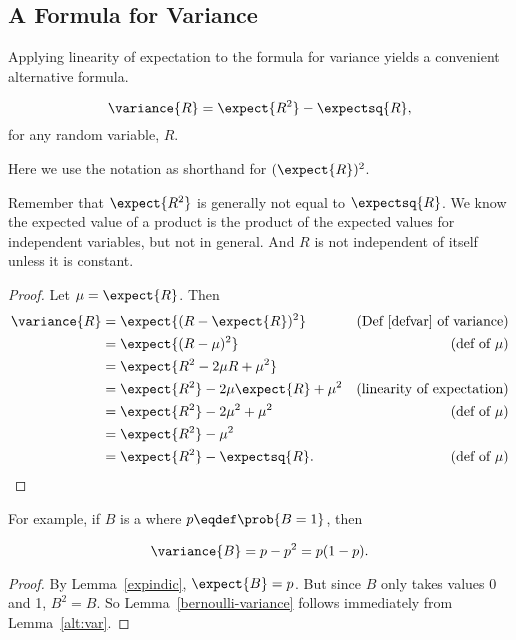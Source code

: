\iffalse
For example, for independent random variables, the variance of a sum
is the sum of the variances; that is, $\variance{R_1 + R_2} =
\variance{R_1} + \variance{R_2}$.  We will prove this fact below.
\fi

\subsection{A Formula for Variance}

Applying linearity of expectation to the formula for variance yields a convenient
alternative formula.
\begin{lemma}\label{alt:var}
\[
\variance{R} = \expect{R^2} - \expectsq{R},
\]
for any random variable, $R$.
\end{lemma}
Here we use the notation  as shorthand for
$(\expect{R})^2$.

\begin{editingnotes}
Remember that $\expect{R^2}$ is generally not equal to $\expectsq{R}$.  We
know the expected value of a product is the product of the expected values
for independent variables, but not in general.  And $R$ is not independent
of itself unless it is constant.

\end{editingnotes}

\begin{proof}
Let $\mu = \expect{R}$.  Then
\begin{align*}
\variance{R} & =   \expect{(R - \expect{R})^2}
               & \text{(Def~\ref{defvar} of variance)}\\
        & = \expect{(R - \mu)^2} & \text{(def of $\mu$)}\\
        & = \expect{R^2 - 2  \mu R + \mu^2} \\
        & = \expect{R^2} - 2 \mu \expect{R} + \mu^2 
                & \text{(linearity of expectation)}\\
        & = \expect{R^2} - 2 \mu^2 + \mu^2
              &  \text{(def of $\mu$)}\\
        & = \expect{R^2} - \mu^2\\
        & = \expect{R^2} - \expectsq{R}.
                  &  \text{(def of $\mu$)}
\end{align*}
\end{proof}

For example, if $B$ is a  where $p\eqdef
\prob{B=1}$, then
\begin{lemma}\label{bernoulli-variance}
\begin{equation}%
\variance{B} = p-p^2 = p(1-p).
\end{equation}
\begin{proof}
  By Lemma~\ref{expindic}, $\expect{B}= p$.  But since $B$ only takes
  values 0 and 1, $B^2 = B$.  So Lemma~\ref{bernoulli-variance} follows
  immediately from Lemma~\ref{alt:var}.
\end{proof}

\end{lemma}

